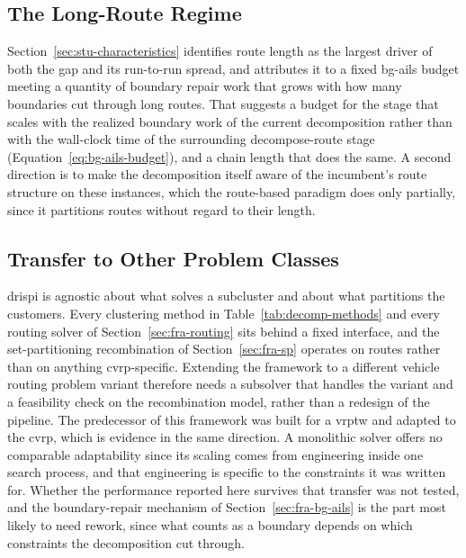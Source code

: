 \subsection{The Long-Route Regime}
\label{sec:con-longroute}

Section~\ref{sec:stu-characteristics} identifies route length as the largest
driver of both the gap and its run-to-run spread, and attributes it to a fixed
\gls{bg-ails} budget meeting a quantity of boundary repair work that grows with how
many boundaries cut through long routes. That suggests a budget for the stage that
scales with the realized boundary work of the current decomposition rather than
with the wall-clock time of the surrounding decompose-route stage
(Equation~\ref{eq:bg-ails-budget}), and a chain length that does the same. A
second direction is to make the decomposition itself aware of the incumbent's
route structure on these instances, which the route-based paradigm does only
partially, since it partitions routes without regard to their length.

\subsection{Transfer to Other Problem Classes}
\label{sec:con-transfer}

\gls{drispi} is agnostic about what solves a subcluster and about what partitions the
customers. Every clustering method in Table~\ref{tab:decomp-methods} and
every routing solver of Section~\ref{sec:fra-routing} sits behind a fixed interface,
and the set-partitioning recombination of Section~\ref{sec:fra-sp}
operates on routes rather than on anything \gls{cvrp}-specific. Extending the
framework to a different vehicle routing problem variant therefore needs a subsolver that handles the variant and
a feasibility check on the recombination model, rather than a redesign of the
pipeline. The predecessor of this framework was built for a \gls{vrptw} \citep{kerscherDecomposerouteimproveFrameworkSolving2025} and adapted to the \gls{cvrp}, which is
evidence in the same direction. A monolithic solver offers no comparable adaptability since
its scaling comes from engineering inside one search process, and that
engineering is specific to the constraints it was written for. Whether the
performance reported here survives that transfer was not tested, and the
boundary-repair mechanism of Section~\ref{sec:fra-bg-ails} is the part most likely to
need rework, since what counts as a boundary depends on which constraints the
decomposition cut through.
